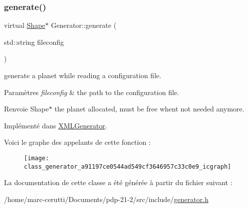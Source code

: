 \subsubsection{\texorpdfstring{generate()}{generate()}}
{\footnotesize\ttfamily virtual \hyperlink{class_shape}{Shape}$\ast$ Generator\+::generate (\begin{DoxyParamCaption}\item[{std\+::string}]{fileconfig }\end{DoxyParamCaption})\hspace{0.3cm}{\ttfamily [pure virtual]}}



generate a planet while reading a configuration file. 


\begin{DoxyParams}{Paramètres}
{\em fileconfig} & the path to the configuration file. \\
\hline
\end{DoxyParams}
\begin{DoxyReturn}{Renvoie}
Shape$\ast$ the planet allocated, must be free whent not needed anymore. 
\end{DoxyReturn}


Implémenté dans \hyperlink{class_x_m_l_generator_aea905ef316503fe716d368ae21f25b9b}{X\+M\+L\+Generator}.

Voici le graphe des appelants de cette fonction \+:\nopagebreak
\begin{figure}[H]
\begin{center}
\leavevmode
\texttt{[image: class\_generator\_a91197ce0544ad549cf3646957c33c0e9\_icgraph]}
\end{center}
\end{figure}


La documentation de cette classe a été générée à partir du fichier suivant \+:\begin{DoxyCompactItemize}
\item 
/home/marc-\/cerutti/\+Documents/pdp-\/21-\/2/src/include/\hyperlink{generator_8h}{generator.\+h}\end{DoxyCompactItemize}
